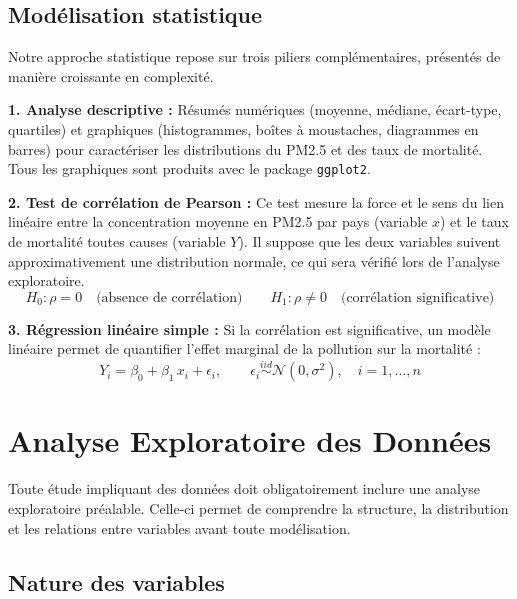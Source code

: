 \documentclass[mstat,12pt]{unswthesis}
\begin{document}
\section{Modélisation statistique}\label{moduxe9lisation-statistique}

Notre approche statistique repose sur trois piliers complémentaires,
présentés de manière croissante en complexité.

\textbf{1. Analyse descriptive :} Résumés numériques (moyenne, médiane,
écart-type, quartiles) et graphiques (histogrammes, boîtes à moustaches,
diagrammes en barres) pour caractériser les distributions du PM2.5 et
des taux de mortalité. Tous les graphiques sont produits avec le package
\texttt{ggplot2}.

\textbf{2. Test de corrélation de Pearson :} Ce test mesure la force et
le sens du lien linéaire entre la concentration moyenne en PM2.5 par
pays (variable \(x\)) et le taux de mortalité toutes causes (variable
\(Y\)). Il suppose que les deux variables suivent approximativement une
distribution normale, ce qui sera vérifié lors de l'analyse
exploratoire.\[H_0 : \rho = 0 \quad \text{(absence de corrélation)} \qquad H_1 : \rho \neq 0 \quad \text{(corrélation significative)}\]

\textbf{3. Régression linéaire simple :} Si la corrélation est
significative, un modèle linéaire permet de quantifier l'effet marginal
de la pollution sur la mortalité
:\[Y_i = \beta_0 + \beta_1 \, x_i + \epsilon_i, \qquad \epsilon_i \overset{iid}{\sim} \mathcal{N}(0, \sigma^2), \quad i = 1, \ldots, n\]

\chapter{Analyse Exploratoire des
Données}\label{analyse-exploratoire-des-donnuxe9es}

Toute étude impliquant des données doit obligatoirement inclure une
analyse exploratoire préalable. Celle-ci permet de comprendre la
structure, la distribution et les relations entre variables avant toute
modélisation.

\section{Nature des variables}\label{nature-des-variables}
\end{document}
